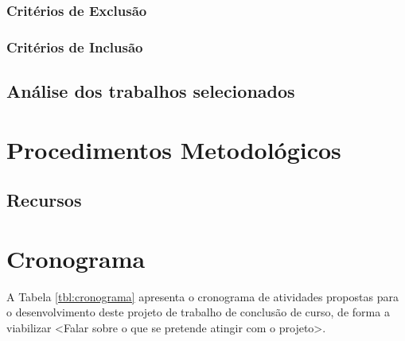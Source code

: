 \subsection{Critérios de Exclusão}


\subsection{Critérios de Inclusão}


\section{Análise dos trabalhos selecionados}

\chapter{Procedimentos Metodológicos}
\label{chap:metodologia}

\section{Recursos}

\chapter{Cronograma}
\label{chap:cronograma}

A Tabela \ref{tbl:cronograma} apresenta o cronograma de atividades propostas para o desenvolvimento deste projeto de trabalho de conclusão de curso, de forma a viabilizar <Falar sobre o que se pretende atingir com o projeto>.

